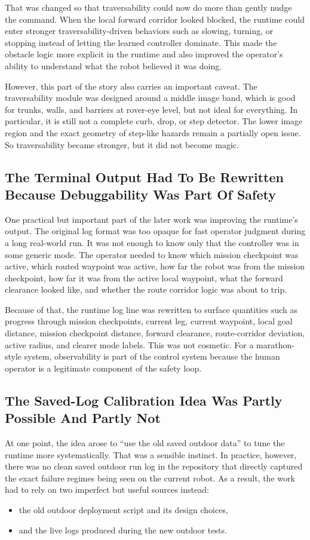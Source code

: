 \documentclass[11pt]{article}
\begin{document}
That was changed so that traversability could now do more than gently nudge the command. When the local forward corridor looked blocked, the runtime could enter stronger traversability-driven behaviors such as slowing, turning, or stopping instead of letting the learned controller dominate. This made the obstacle logic more explicit in the runtime and also improved the operator's ability to understand what the robot believed it was doing.

However, this part of the story also carries an important caveat. The traversability module was designed around a middle image band, which is good for trunks, walls, and barriers at rover-eye level, but not ideal for everything. In particular, it is still not a complete curb, drop, or step detector. The lower image region and the exact geometry of step-like hazards remain a partially open issue. So traversability became stronger, but it did not become magic.

\subsection{The Terminal Output Had To Be Rewritten Because Debuggability Was Part Of Safety}
One practical but important part of the later work was improving the runtime's output. The original log format was too opaque for fast operator judgment during a long real-world run. It was not enough to know only that the controller was in some generic mode. The operator needed to know which mission checkpoint was active, which routed waypoint was active, how far the robot was from the mission checkpoint, how far it was from the active local waypoint, what the forward clearance looked like, and whether the route corridor logic was about to trip.

Because of that, the runtime log line was rewritten to surface quantities such as progress through mission checkpoints, current leg, current waypoint, local goal distance, mission checkpoint distance, forward clearance, route-corridor deviation, active radius, and clearer mode labels. This was not cosmetic. For a marathon-style system, observability is part of the control system because the human operator is a legitimate component of the safety loop.

\subsection{The Saved-Log Calibration Idea Was Partly Possible And Partly Not}
At one point, the idea arose to ``use the old saved outdoor data'' to tune the runtime more systematically. That was a sensible instinct. In practice, however, there was no clean saved outdoor run log in the repository that directly captured the exact failure regimes being seen on the current robot. As a result, the work had to rely on two imperfect but useful sources instead:
\begin{itemize}[leftmargin=*]
\item the old outdoor deployment script and its design choices,
\item and the live logs produced during the new outdoor tests.
\end{itemize}
\end{document}
